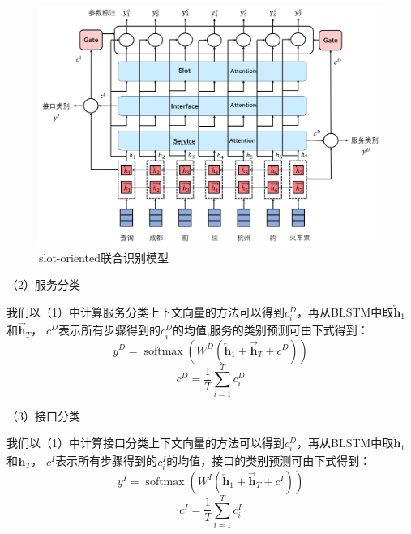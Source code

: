 \begin{figure}[htbp]
  \centering
  \includegraphics[width=17cm]{./images/lianhe.jpg}
  \caption{slot-oriented联合识别模型}
  \label{fig:lianhe1}
\end{figure}

（2）服务分类

我们以（1）中计算服务分类上下文向量的方法可以得到${c}_{i}^{D}$，再从BLSTM中取$\overleftarrow{\mathbf{h}}_{1}$和$\overrightarrow{\mathbf{h}}_{T}$，
$c^{D}$表示所有步骤得到的$c_i^{D}$的均值,服务的类别预测可由下式得到：
\begin{equation}
    y^{D}=\operatorname{softmax}\left(W^{D}\left(\overleftarrow{\mathbf{h}}_{1}+\overrightarrow{\mathbf{h}}_{T}+c^{D}\right)\right)
  \end{equation}
  \begin{equation}
    c^{D}=\frac{1}{T}\sum_{i=1}^{T} c_i^{D}
  \end{equation}

（3）接口分类

  我们以（1）中计算接口分类上下文向量的方法可以得到${c}_{i}^{D}$，再从BLSTM中取$\overleftarrow{\mathbf{h}}_{1}$和$\overrightarrow{\mathbf{h}}_{T}$，
  $c^{I}$表示所有步骤得到的$c_i^{I}$的均值，接口的类别预测可由下式得到：
  \begin{equation}
      y^{I}=\operatorname{softmax}\left(W^{I}\left(\overleftarrow{\mathbf{h}}_{1}+\overrightarrow{\mathbf{h}}_{T}+c^{I}\right)\right)
    \end{equation} 
    \begin{equation}
        c^{I}=\frac{1}{T}\sum_{i=1}^{T} c_i^{I}
      \end{equation}


